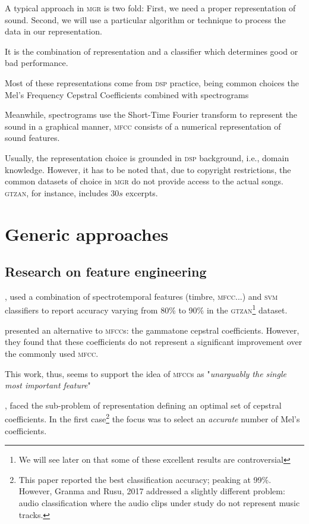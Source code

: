 \label{chap:litreview}
A typical approach in \textsc{\textsc{mgr}} is two fold: First, we need a proper representation of sound. Second, we will use a particular algorithm or technique to process the data in our representation.

It is the combination of representation and a classifier which determines good or bad performance.

Most of these representations come from \textsc{\textsc{dsp}} practice, being common choices the Mel’s Frequency Cepstral Coefficients \citep{zhou} combined with spectrograms \citep{markhandy}

Meanwhile, spectrograms use the Short-Time Fourier transform to represent the sound in a graphical manner, \textsc{mfcc} consists of a numerical representation of sound features.

Usually, the representation choice is grounded in \textsc{\textsc{dsp}} background, i.e., domain knowledge. However, it has to be noted that, due to copyright restrictions, the
common datasets of choice in \textsc{\textsc{mgr}} do not provide access to the actual songs. \textsc{gtzan}, for instance, includes $30s$ excerpts.

\section{Generic approaches}

\subsection{Research on feature engineering}

\citet{yandra}, used a combination of spectrotemporal features (timbre, \textsc{mfcc}...) and \textsc{svm} classifiers to report accuracy varying from 80\% to 90\% in the \textsc{gtzan}\footnote{We will see later on that some of these excellent results are controversial} dataset.

\citet{valero} presented an alternative to \textsc{mfcc}s: the gammatone cepstral coefficients. However, they found that these coefficients do not represent a significant improvement over the commonly used \textsc{mfcc}.

This work, thus, seems to support the idea of \textsc{mfcc}s as "{\it unarguably the single most important feature}" \citep{zhou}

\citet{granmarusu}, faced the sub-problem of representation defining an optimal set of cepstral coefficients. In the first case\footnote{This paper reported the best classification accuracy; peaking at 99\%. However, Granma and Rusu, 2017 addressed a slightly different problem: audio classification where the audio clips under study do not represent music tracks.} the focus was to select an {\it accurate} number of Mel’s coefficients.

